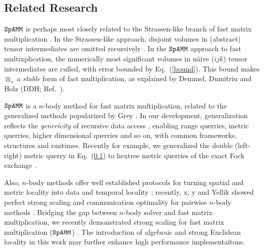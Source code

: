 \documentclass[letterpaper,twocolumn,amsmath,amsfont,amssymb,english,aps,jcp,preprintnumbers,groupaddress,nofootinbib,tightenlines,floatfix]{revtex4}
\newcommand{\ot}{  {\scriptstyle \otimes}_{ \tau } }
\theoremstyle{plain}
\theoremstyle{remark}
\theoremstyle{plain}
\begin{document}
\subsection{Related Research} 

$\tt SpAMM$ is perhaps most closely related to the Strassen-like branch of fast matrix multiplication 
\cite{springerlink:10.1007/BF02165411,Ballard2014}.
In the Strassen-like approach, disjoint volumes in (abstract) tensor intermediates are omitted recursively \cite{}.  
In the $\tt SpAMM$ approach to fast multixplication, the numerically most significant volumes in 
 n\"{a}ive ($ijk$) tensor intermediates are culled, with error bounded by Eq.~(\ref{bound}).  
This bound makes $\ot$ a {\em stable} form of fast multiplication,  as explained by Demmel, Dumitriu and Holz (DDH; Ref.~\cite{Demmel07}).

$\tt SpAMM$ is a $n$-body method for fast matrix multiplication, related to the 
generalized methods popularized by Grey \cite{Gray2001,Gray2003}. In our development,
generalization reflects the {\em genericity} \cite{} of recursive data access \cite{}, 
enabling range querries, metric querries, higher dimensional querries and so on, with common frameworks, 
structures and runtimes.  Recently for example, we generalized the double (left-right) metric querry in 
Eq.~(\ref{}) to hextree metric querries of the exact Fock exchange \cite{}.  

Also, $n$-body methods offer well established protocols for turning spatial and metric locality into 
data and temporal locality \cite{}; recently, x, y  and Yellik showed perfect strong scaling and communication optimality 
for pairwise $n$-body methods \cite{Yellik}.   Bridging the gap between 
$n$-body solver and fast matrix multiplication, we recently demonstrated strong scaling for fast matrix multiplication ($\tt SpAMM$) \cite{}.  
The introduction of algebraic and strong Euclidean locality in this work may further enhance high performance implementaitons. 

\end{document}
